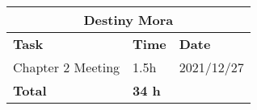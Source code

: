\begin{table}
\centering
\begin{tabular}{|p{}|p{}|p{}|}
\hline
\multicolumn{3}{|c|}{\textbf{Destiny Mora}}\\\hline
\textbf{Task} & \textbf{Time} & \textbf{Date}\\\hline
Chapter 2 Meeting & 1.5h & 2021/12/27\\\hline
\textbf{Total} & \textbf{34 h} &\\\hline
\end{tabular}
\end{table}
